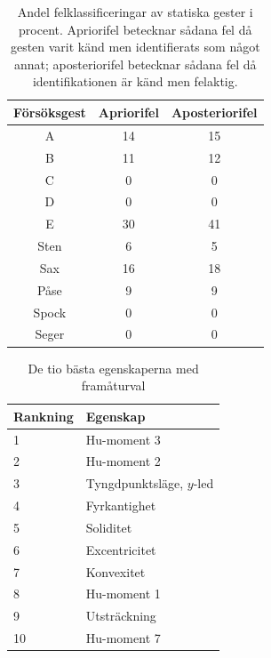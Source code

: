 \documentclass[../rapport_MVEX01-11-05]{subfiles}
\begin{document}
\clearpage

\begin{table}[p]
	\centering
	\caption{Andel felklassificeringar av statiska gester i procent. Apriorifel
	betecknar sådana fel då gesten varit känd men identifierats
	som något annat; aposteriorifel betecknar sådana fel då
	identifikationen är känd men felaktig.}
	\smallskip
	\label{tab:prestanda}
	\begin{tabular}{c c c}
		\toprule 
		Försöksgest & Apriorifel & Aposteriorifel \\
		\midrule 
		A & 14&15 \\
		B & 11&12 \\
		C & 0& 0\\
		D & 0& 0\\
		E & 30& 41\\
		Sten & 6& 5\\
		Sax & 16& 18\\
		Påse & 9& 9\\
		Spock & 0& 0\\
		Seger & 0& 0\\
		\bottomrule 
	\end{tabular}
\end{table}

\begin{table}[p]
	\centering
	\caption{De tio bästa egenskaperna med framåturval}
	
	\label{tab:bestfeatsfwd}
	\begin{tabular}{ll}
		\toprule
		Rankning & Egenskap \\
		\midrule
		1 & Hu-moment 3 \\
		2 & Hu-moment 2 \\
		3 & Tyngdpunktsläge, $y$-led \\
		4 & Fyrkantighet \\
		5 & Soliditet \\
		6 & Excentricitet \\
		7 & Konvexitet \\
		8 & Hu-moment 1 \\
		9 & Utsträckning \\
		10 & Hu-moment 7 \\
		\bottomrule
	\end{tabular}
\end{table}
\end{document}
